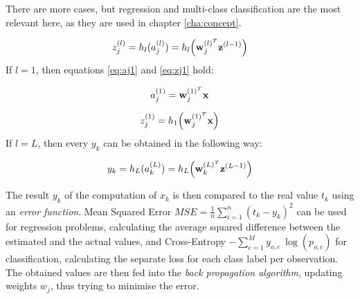 There are more cases, but regression and multi-class classification are the most relevant here, as they are used in chapter \ref{cha:concept}.

\begin{equation} \label{eq:zj}
	z_j^{(l)} = h_l(a_j^{(l)}) = h_l\Big(\bold{w}_j^{(l)^T} \bold{z}^{(l-1)}\Big)	
\end{equation}
If $l=1$, then equations \ref{eq:aj1} and \ref{eq:zj1} hold:

\begin{equation} \label{eq:aj1}
	a_j^{(1)}=\bold{w}_j^{(1)^T}\bold{x}
\end{equation}

\begin{equation} \label{eq:zj1}
	z_j^{(1)}=h_1\Big(\bold{w}_j^{(1)^T}\bold{x}\Big)
\end{equation}
If $l=L$, then every $y_k$ can be obtained in the following way:

\begin{equation}
	y_k = h_L(a_k^{(L)}) = h_L\Big( \bold{w}_k^{(L)^T} \bold{z}^{(L-1)} \Big)
\end{equation}

The result $y_k$ of the computation of $x_k$ is then compared to the real value $t_k$ using an \textit{error function}. Mean Squared Error $MSE = \frac{1}{n} \sum_{i=1}^n (t_k-y_k)^2$ can be used for regression problems, calculating the average squared difference between the estimated and the actual values, and Cross-Entropy $-\sum_{c=1}^My_{o,c} \: \log(p_{o,c})$ for classification, calculating the separate loss for each class label per observation. The obtained values are then fed into the \textit{back propagation algorithm}, updating weights $w_j$, thus trying to minimise the error. 


\begin{comment}
Figure \ref{fig:simple_neural_network} shows a simple neural network with three input features $v_1, v_2, v_3$. The output neuron is composed of the forward propagation function given by the weighted sums of neuron values, where the weights are $w_i$, and the activation function given by $h$. There exists a large variety of activation functions in use, depending on the given use case. The learning process of a neural network consists of learning the weights

Training of a neural network happens through 
Training of a neural network can be done in an \textit{unsupervised} and \textit{supervised} manner. Supervised training of 
The complexity of neural networks can be increased by adding more neurons and additional layers, making it possible to process larger input and potentially receive better results in prediction. The concept of the traditional feedforward neural networks is subject to constant architectural enhancement. 

Through the surge of available cheap computing power, deep learning models with high numbers of layers of neurons can be trained on large amounts of data. Also, the concept of the traditional neural network is constantly being 
\end{comment}



